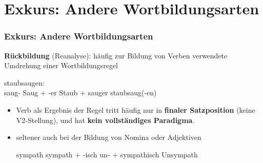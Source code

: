 \section{Exkurs: Andere Wortbildungsarten}

\begin{frame}
\frametitle{Exkurs: Andere Wortbildungsarten}


\textbf{Rückbildung} (Reanalyse): häufig zur Bildung von Verben verwendete Umdrehung einer Wortbildungsregel

\ea staubsaugen:\\
saug- \ras {}Saug $+$ -er \ras {}Staub $+$ sauger \ras {}staubsaug(-en)
\z

\begin{itemize}

\item Verb als Ergebnis der Regel tritt häufig nur in \textbf{finaler Satzposition} (keine V2-Stellung), und hat \idR \textbf{kein vollständiges Paradigma}.


\ea 
{}
\z 
\z

\item seltener auch bei der Bildung von Nomina oder Adjektiven

\ea sympath \ras sympath $+$ -isch \ras un- $+$ sympathisch \ras Unsympath
\z

\end{itemize}


\end{frame}


